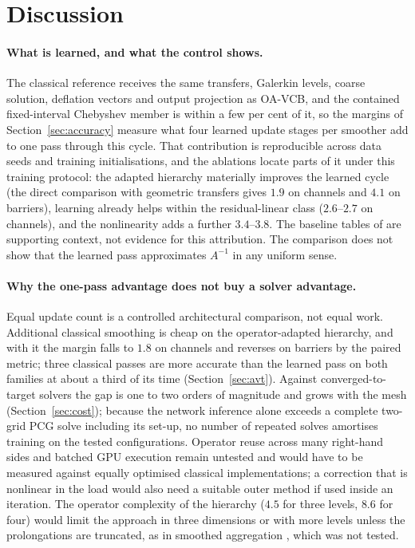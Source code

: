 \section{Discussion}\label{sec:discussion}

\paragraph{What is learned, and what the control shows.} The classical reference receives the same transfers, Galerkin
levels, coarse solution, deflation vectors and output projection as OA-VCB, and the contained fixed-interval Chebyshev member
is within a few per cent of it, so the margins of Section~\ref{sec:accuracy} measure what four learned update stages per
smoother add to one pass through this cycle. That contribution is reproducible across data seeds and training
initialisations, and the ablations locate parts of it under this training protocol: the adapted hierarchy materially improves
the learned cycle (the direct comparison with geometric transfers gives $1.9$ on channels and $4.1$ on barriers), learning
already helps within the residual-linear class ($2.6$--$2.7$ on channels), and the nonlinearity adds a further $3.4$--$3.8$.
The baseline tables of  are supporting context, not evidence for this attribution. The comparison does
not show that the learned pass approximates $A^{-1}$ in any uniform sense.

\paragraph{Why the one-pass advantage does not buy a solver advantage.} Equal update count is a controlled architectural
comparison, not equal work. Additional classical smoothing is cheap on the operator-adapted hierarchy, and with it the margin
falls to $1.8$ on channels and reverses on barriers by the paired metric; three classical passes are more accurate than the
learned pass on both families at about a third of its time (Section~\ref{sec:avt}). Against converged-to-target solvers the gap is one to two
orders of magnitude and grows with the mesh (Section~\ref{sec:cost}); because the network inference alone exceeds a complete
two-grid PCG solve including its set-up, no number of repeated solves amortises training on the tested configurations.
Operator reuse across many right-hand sides and batched GPU execution remain untested and would have to be measured against
equally optimised classical implementations; a correction that is nonlinear in the load would also need a suitable outer
method if used inside an iteration. The operator complexity of the hierarchy ($4.5$ for three levels, $8.6$ for four) would
limit the approach in three dimensions or with more levels unless the prolongations are truncated, as in smoothed aggregation
\cite{vanek1996}, which was not tested.

